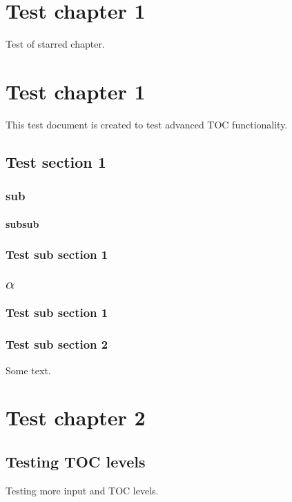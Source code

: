 \chapter*{Test chapter 1}
Test of starred chapter.

\chapter{Test chapter 1}
This test document is created to test advanced TOC functionality.

\section{Test section 1}

\subsection{sub}

\subsubsection{subsub}


\subsection{Test sub section 1}

\section{$\alpha$}

\subsection{Test sub section 1}

\subsection{Test sub section 2}
Some text.

\chapter{Test chapter 2}

\section{Testing TOC levels}
Testing more input and TOC levels.


